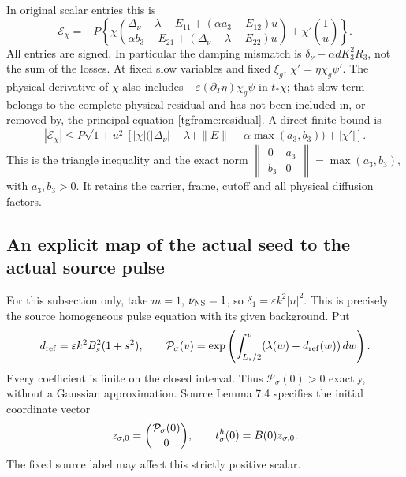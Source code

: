 In original scalar entries this is
\begin{equation}\label{tgframe:residualentries}
 \mathcal E_\chi=-P
 \left\{\chi
 \binom{\Delta_\nu-\lambda-E_{11}+(\alpha a_3-E_{12})u}
       {\alpha b_3-E_{21}+(\Delta_\nu+\lambda-E_{22})u}
       +\chi'\binom1u\right\}.
\end{equation}
All entries are signed. In particular the damping mismatch is
$\delta_\nu-\alpha dK_3^2R_3$, not the sum of the losses.
At fixed slow variables and fixed $\xi_g$, $\chi'=\eta\chi_g\psi'$.
The physical derivative of $\chi$ also includes
$-\varepsilon(\partial_T\eta)\chi_g\psi$ in $t_*\chi$; that slow term
belongs to the complete physical residual and has not been included in,
or removed by, the principal equation \eqref{tgframe:residual}.
A direct finite bound is
\[
 |\mathcal E_\chi|
 \le P\sqrt{1+u^2}\left[
 |\chi|\bigl(|\Delta_\nu|+\lambda+\|E\|
                  +\alpha\max(a_3,b_3)\bigr)+|\chi'|\right].
\]
This is the triangle inequality and the exact norm
$\left\|\begin{smallmatrix}0&a_3\\b_3&0\end{smallmatrix}\right\|
=\max(a_3,b_3)$, with $a_3,b_3>0$.
It retains the carrier, frame, cutoff and all physical diffusion factors.

\subsection{An explicit map of the actual seed to the actual source pulse}

For this subsection only, take $m=1$, $\nu_{\rm NS}=1$, so
$\delta_1=\varepsilon k^2|n|^2$. This is precisely the source
homogeneous pulse equation with its given background. Put
\[
 d_{\rm ref}=\varepsilon k^2B_s^2(1+s^2),\qquad
 {\cal P}_\sigma(v)=
   \exp\left(\int_{L_s/2}^{v}(\lambda(w)-d_{\rm ref}(w))\,dw\right).
\]
Every coefficient is finite on the closed interval. Thus
$\mathcal P_\sigma(0)>0$ exactly, without a Gaussian approximation.
Source Lemma 7.4 specifies the initial coordinate vector
\[
 z_{\sigma,0}=\binom{{\cal P}_\sigma(0)}0,\qquad
 t^h_\sigma(0)=B(0)z_{\sigma,0}.
\]
The fixed source label may affect this strictly positive scalar.

